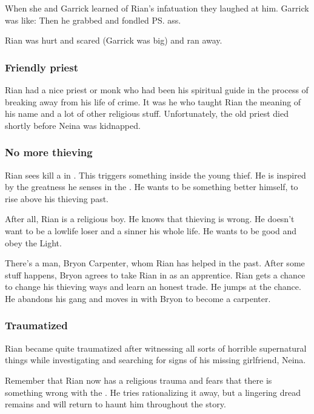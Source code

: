 When she and Garrick learned of Rian's infatuation they laughed at him. 
Garrick was like: 
Then he grabbed and fondled \ps{\Mya} ass. 

Rian was hurt and scared (Garrick was big) and ran away. 





\subsubsection{Friendly priest}
Rian had a nice priest or monk who had been his spiritual guide in the process of breaking away from his life of crime. 
It was he who taught Rian the meaning of his name and a lot of other religious stuff. 
Unfortunately, the old priest died shortly before Neina was kidnapped. 





\subsubsection{No more thieving}
Rian sees \QuessanthIshnaruchaefir{} kill a \ghobal{} in \Malcur. 
This triggers something inside the young thief. 
He is inspired by the greatness he senses in the \draconic{} \vertex. 
He wants to be something better himself, to rise above his thieving past. 

After all, Rian is a religious boy. 
He knows that thieving is wrong. 
He doesn't want to be a lowlife loser and a sinner his whole life. 
He wants to be good and obey the Light. 

There's a man, Bryon Carpenter, whom Rian has helped in the past. 
After some stuff happens, Bryon agrees to take Rian in as an apprentice. 
Rian gets a chance to change his thieving ways and learn an honest trade. 
He jumps at the chance. 
He abandons his gang and moves in with Bryon to become a carpenter. 





\subsubsection{Traumatized}
Rian became quite traumatized after witnessing all sorts of horrible supernatural things while investigating \Malcur and searching for signs of his missing girlfriend, Neina. 

Remember that Rian now has a religious trauma and fears that there is something wrong with the \sephiroth. 
He tries rationalizing it away, but a lingering dread remains and will return to haunt him throughout the story. 

